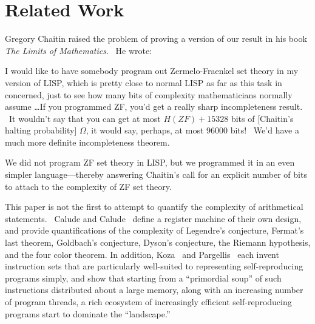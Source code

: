 \documentclass[11pt]{article}
\begin{document}
\section{Related Work}

Gregory Chaitin raised the problem of proving a version of our result in his book \emph{The Limits of Mathematics}. \ He wrote:

\begin{displayquote}
\noindent I would like to have somebody program out Zermelo-Fraenkel set theory in my version of LISP, which is pretty close to normal LISP as far as this task in concerned, just to see how many bits of complexity mathematicians normally assume \dots If you programmed ZF, you'd get a really sharp incompleteness result. \ It wouldn't say that you can get at most $H(ZF) + 15328$ bits of [Chaitin's halting probability] $\Omega$, it would say, perhaps, at most 96000 bits! \ We'd have a much more definite incompleteness theorem.
\end{displayquote}

We did not program ZF set theory in LISP, but we programmed it in an even simpler language---thereby answering Chaitin's call for an explicit number of bits to attach to the complexity of ZF set theory.

This paper is not the first to attempt to quantify the complexity of arithmetical statements. \ Calude and Calude~\cite{calude} define a register machine of their own design, and provide quantifications of the complexity of Legendre's conjecture, Fermat's last theorem, Goldbach's conjecture, Dyson's conjecture, the Riemann hypothesis, and the four color theorem.\footnotemark
{}
In addition, Koza~\cite{koza} and Pargellis~\cite{pargellis} each invent instruction sets that are particularly well-suited to representing self-reproducing programs simply, and show that starting from a ``primordial soup'' of such instructions distributed about a large memory, along with an increasing number of program threads, a rich ecosystem of increasingly efficient self-reproducing programs start to dominate the ``landscape.''
\end{document}

